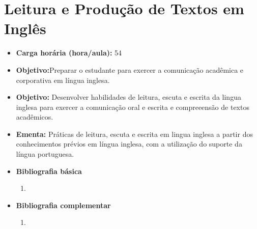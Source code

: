 \documentclass[11pt,fleqn]{book} %
\begin{document}
\newpage
\section{Leitura e Produção de Textos em Inglês}\label{1_inglacad}
\begin{itemize}
	\item \textbf{Carga horária (hora/aula):} 54
	\item \textbf{Objetivo:}Preparar o estudante para exercer a comunicação acadêmica e corporativa em língua inglesa.
	\item \textbf{Objetivo:} Desenvolver habilidades de leitura, escuta e escrita da lingua inglesa para exercer a comunicação oral e escrita e compreeensão de textos acadêmicos.
	\item \textbf{Ementa:} 
	Práticas de leitura, escuta e escrita em lingua inglesa a partir dos conhecimentos prévios em língua inglesa, com a utilização do suporte da língua portuguesa.
	\item \textbf{Bibliografia básica}
	\begin{enumerate}
		\item 
	\end{enumerate}
	\item \textbf{Bibliografia complementar}
	\begin{enumerate}
		\item 
	\end{enumerate}	
\end{itemize}



\newpage
\end{document}
